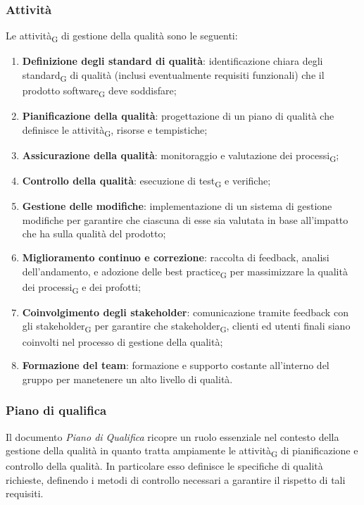 {{\subsubsection{Attività}
Le {attività\textsubscript{G}} di gestione della qualità sono le seguenti:
\begin{enumerate}
    \item \textbf{Definizione degli standard di qualità}: identificazione chiara degli {standard\textsubscript{G}} di qualità
    (inclusi eventualmente requisiti funzionali) che il prodotto {software\textsubscript{G}} deve soddisfare;
    \item \textbf{Pianificazione della qualità}: progettazione di un piano di qualità che definisce le {attività\textsubscript{G}},
    risorse e tempistiche;
    \item \textbf{Assicurazione della qualità}: monitoraggio e valutazione dei {processi\textsubscript{G}};
    \item \textbf{Controllo della qualità}: esecuzione di {test\textsubscript{G}} e verifiche;
    \item \textbf{Gestione delle modifiche}: implementazione di un sistema di gestione modifiche per garantire che ciascuna di esse sia valutata
    in base all'impatto che ha sulla qualità del prodotto;
    \item \textbf{Miglioramento continuo e correzione}: raccolta di feedback, analisi dell'andamento, e adozione delle 
    {best practice\textsubscript{G}} per massimizzare la qualità dei {processi\textsubscript{G}} e dei profotti;
    \item \textbf{Coinvolgimento degli stakeholder}: comunicazione tramite feedback con gli {stakeholder\textsubscript{G}} 
    per garantire che {stakeholder\textsubscript{G}}, clienti ed utenti finali siano coinvolti nel processo di gestione della qualità;
    \item \textbf{Formazione del team}: formazione e supporto costante all'interno del gruppo per manetenere un alto livello di qualità.
\end{enumerate}

\subsubsection{Piano di qualifica}
Il documento \textit{Piano di Qualifica} ricopre un ruolo essenziale nel contesto della gestione della qualità in quanto tratta ampiamente
le {attività\textsubscript{G}} di pianificazione e controllo della qualità. In particolare esso definisce le specifiche di qualità
richieste, definendo i metodi di controllo necessari a garantire il rispetto di tali requisiti.

}}
